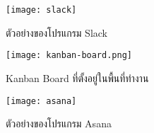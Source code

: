 \begin{figure}[!h]
	\centering
	\texttt{[image: slack]}  
	\caption{ตัวอย่างของโปรแกรม Slack}
	\label{Fig:slack}
\end{figure}

\begin{figure}[!h]
	\centering
	\texttt{[image: kanban-board.png]}  
	\caption{Kanban Board ที่ตั้งอยู่ในพื้นที่ทำงาน}
	\label{Fig:kanban-board}
\end{figure}

\begin{figure}[!h]
	\centering
	\texttt{[image: asana]}  
	\caption{ตัวอย่างของโปรแกรม Asana}
	\label{Fig:asana}
\end{figure}